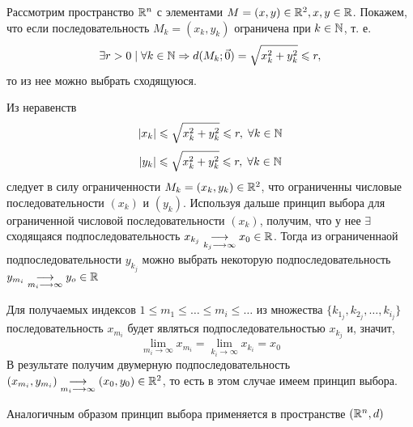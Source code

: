 \documentclass[../../main.tex]{subfiles}
\begin{document}
	\begin{exmp}
		Рассмотрим пространство $\mathbb{R}^n$ с элементами $M=(x,y) \in \mathbb{R}^2, x,y \in \mathbb{R}$. 
		Покажем, что если последовательность $M_k=(x_k,y_k)$ ограничена при $k \in \mathbb{N}$, т. е.
		\[
		\exists r>0 \; | \; \forall k \in \mathbb{N} \Rightarrow d(M_k; \vec0)=\sqrt{x^2_k+y^2_k} \leqslant r,
		\]
		то из нее можно выбрать сходящуюся.
		
		Из неравенств
		\[ 
		|x_k| \leqslant \sqrt{x^2_k+y^2_k}\leqslant r, \; \forall k \in \mathbb{N} 
		\]
		\[ 
		|y_k| \leqslant \sqrt{x^2_k+y^2_k}\leqslant r, \; \forall k \in \mathbb{N} 
		\]
		следует в силу ограниченности $M_k=(x_k,y_k) \in \mathbb{R}^2$, что ограниченны числовые последовательности $(x_k)$ и $(y_k)$. 
		Используя дальше принцип выбора для ограниченной числовой последовательности $(x_k)$,
		получим, что у нее $\exists$ сходящаяся подпоследовательность
		$x_{k_j}\underset{k_j \longrightarrow \infty}
		{\longrightarrow}x_0 \in \mathbb{R}$.
		Тогда из ограниченнаой подпоследовательности $y_{k_j}$ можно выбрать некоторую подпоследовательность
		$y_{m_i}\underset{m_i\longrightarrow \infty}{\longrightarrow}y_o \in \mathbb{R}$
		
		Для получаемых индексов $1 \leqslant m_1 \leqslant \dots \leqslant m_i \leqslant \dots $ из множества
		$\{k_{1_j}, k_{2_j}, \dots, k_{i_j}\}$
		последовательность $ x_{m_i} $ будет являться подпоследовательностью $ x_{k_j} $ и, значит, 
		\[  \lim_{m_i \to \infty}{x_{m_i}}= \lim_{k_i \to \infty}{x_{k_i}}=  x_0\]
		В результате получим двумерную подпоследовательность $(x_{m_i}, y_{m_i}) \underset{m_i\longrightarrow \infty}{\longrightarrow} (x_0, y_0) \in \mathbb{R}^2$,
		то есть в этом случае имеем принцип выбора.
		
		Аналогичным образом принцип выбора применяется в пространстве $(\mathbb{R}^n, d)$
	\end{exmp}
\end{document}
